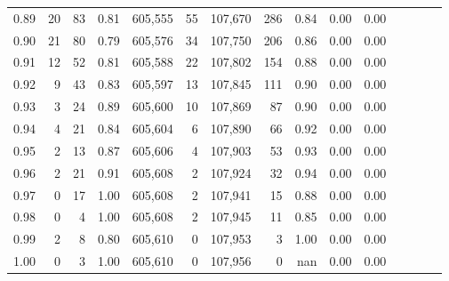 \begin{tabular}{rrrcrrrrrrrrrrr}
0.89 &      20 &     83 &                                       0.81 &  605,555 &       55 &  107,670 &      286 &  0.84 &  0.00 &                         0.00 \\
0.90 &      21 &     80 &                                       0.79 &  605,576 &       34 &  107,750 &      206 &  0.86 &  0.00 &                         0.00 \\
0.91 &      12 &     52 &                                       0.81 &  605,588 &       22 &  107,802 &      154 &  0.88 &  0.00 &                         0.00 \\
0.92 &       9 &     43 &                                       0.83 &  605,597 &       13 &  107,845 &      111 &  0.90 &  0.00 &                         0.00 \\
0.93 &       3 &     24 &                                       0.89 &  605,600 &       10 &  107,869 &       87 &  0.90 &  0.00 &                         0.00 \\
0.94 &       4 &     21 &                                       0.84 &  605,604 &        6 &  107,890 &       66 &  0.92 &  0.00 &                         0.00 \\
0.95 &       2 &     13 &                                       0.87 &  605,606 &        4 &  107,903 &       53 &  0.93 &  0.00 &                         0.00 \\
0.96 &       2 &     21 &                                       0.91 &  605,608 &        2 &  107,924 &       32 &  0.94 &  0.00 &                         0.00 \\
0.97 &       0 &     17 &                                       1.00 &  605,608 &        2 &  107,941 &       15 &  0.88 &  0.00 &                         0.00 \\
0.98 &       0 &      4 &                                       1.00 &  605,608 &        2 &  107,945 &       11 &  0.85 &  0.00 &                         0.00 \\
0.99 &       2 &      8 &                                       0.80 &  605,610 &        0 &  107,953 &        3 &  1.00 &  0.00 &                         0.00 \\
1.00 &       0 &      3 &                                       1.00 &  605,610 &        0 &  107,956 &        0 &   nan &  0.00 &                         0.00 \\
\bottomrule
\end{tabular}
